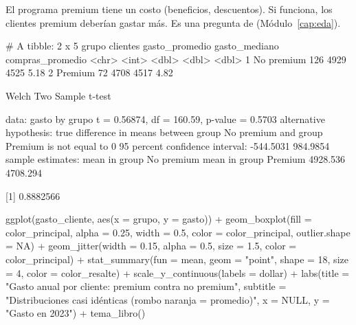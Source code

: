 El programa premium tiene un costo (beneficios, descuentos). Si funciona,
los clientes premium deberían gastar más. Es una pregunta de
 (Módulo~\ref{cap:eda}).


\begin{rsalida}
# A tibble: 2 x 5
  grupo      clientes gasto_promedio gasto_mediano compras_promedio
  <chr>         <int>          <dbl>         <dbl>            <dbl>
1 No premium      126           4929          4525             5.18
2 Premium          72           4708          4517             4.82

	Welch Two Sample t-test

data:  gasto by grupo
t = 0.56874, df = 160.59, p-value = 0.5703
alternative hypothesis: true difference in means between group No premium and group Premium is not equal to 0
95 percent confidence interval:
 -544.5031  984.9854
sample estimates:
mean in group No premium    mean in group Premium 
                4928.536                 4708.294 

[1] 0.8882566
\end{rsalida}

\begin{rcode}
ggplot(gasto_cliente, aes(x = grupo, y = gasto)) +
  geom_boxplot(fill = color_principal, alpha = 0.25, width = 0.5,
               color = color_principal, outlier.shape = NA) +
  geom_jitter(width = 0.15, alpha = 0.5, size = 1.5,
              color = color_principal) +
  stat_summary(fun = mean, geom = "point", shape = 18, size = 4,
               color = color_resalte) +
  scale_y_continuous(labels = dollar) +
  labs(title = "Gasto anual por cliente: premium contra no premium",
       subtitle = "Distribuciones casi idénticas (rombo naranja = promedio)",
       x = NULL, y = "Gasto en 2023") +
  tema_libro()
\end{rcode}

